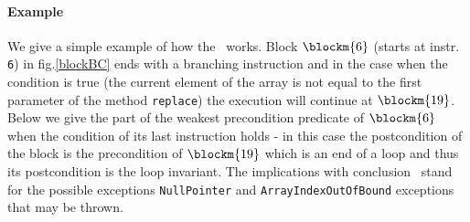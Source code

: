 \paragraph{Example} We give a simple example of how the \wpi \ works. Block $\blockm{6}$ (starts at instr. \texttt{6}) in fig.\ref{blockBC} ends with a branching instruction and in the case when the condition is true (the current element of the array is not equal to the first parameter of the method \texttt{replace}) the execution will continue at $\blockm{19}$. Below we give the part of the weakest precondition predicate of $\blockm{6}$ when the condition of its last instruction holds - in this case the postcondition of the block is the precondition of $\blockm{19}$ which is an end of a loop and thus its postcondition is the loop invariant. The implications with conclusion \Myfalse \ stand for the possible exceptions \texttt{NullPointer} and \texttt{ArrayIndexOutOfBound}  exceptions that may be thrown. 








